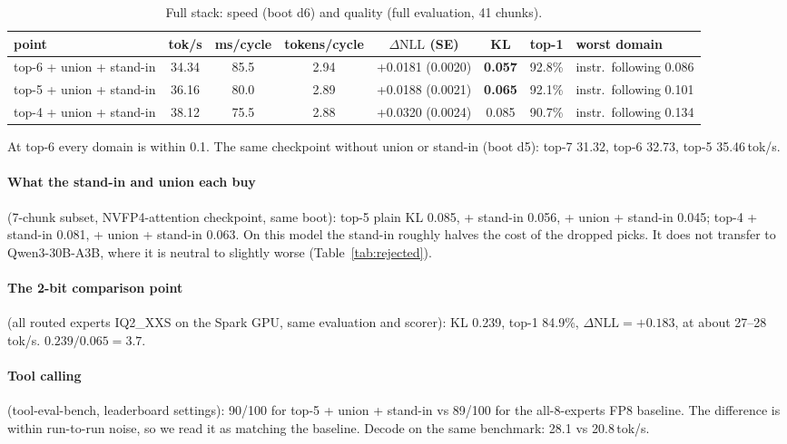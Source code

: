 \documentclass[11pt]{article}
\newcommand{\tps}{\,tok/s}
\newcommand{\dNLL}{\Delta\mathrm{NLL}}
\begin{document}
\begin{table}[h]
\centering\small
\caption{Full stack: speed (boot d6) and quality (full evaluation, 41 chunks).}
\label{tab:stack}
\setlength{\tabcolsep}{4pt}
\begin{adjustbox}{max width=\linewidth}
\begin{tabular}{lccc|cccl}
\toprule
point & tok/s & ms/cycle & tokens/cycle & $\dNLL$ (SE) & KL & top-1 & worst domain \\
\midrule
top-6 + union + stand-in & 34.34 & 85.5 & 2.94 & +0.0181 (0.0020) & \textbf{0.057} & 92.8\% & instr.\ following 0.086 \\
top-5 + union + stand-in & 36.16 & 80.0 & 2.89 & +0.0188 (0.0021) & \textbf{0.065} & 92.1\% & instr.\ following 0.101 \\
top-4 + union + stand-in & 38.12 & 75.5 & 2.88 & +0.0320 (0.0024) & 0.085 & 90.7\% & instr.\ following 0.134 \\
\bottomrule
\end{tabular}
\end{adjustbox}
\end{table}

At top-6 every domain is within 0.1. The same checkpoint without union or stand-in (boot d5): top-7 31.32, top-6 32.73, top-5 35.46\tps.

\paragraph{What the stand-in and union each buy} (7-chunk subset, NVFP4-attention checkpoint, same boot): top-5 plain
KL 0.085, + stand-in 0.056, + union + stand-in 0.045; top-4 + stand-in 0.081, + union + stand-in 0.063. On this model
the stand-in roughly halves the cost of the dropped picks. It does not transfer to Qwen3-30B-A3B, where it is neutral to
slightly worse (Table~\ref{tab:rejected}).

\paragraph{The 2-bit comparison point} (all routed experts IQ2\_XXS on the Spark GPU, same evaluation and scorer): KL
0.239, top-1 84.9\%, $\dNLL = +0.183$, at about 27--28\tps. $0.239 / 0.065 = 3.7$.

\paragraph{Tool calling} (tool-eval-bench, leaderboard settings): 90/100 for top-5 + union + stand-in vs 89/100 for the
all-8-experts FP8 baseline. The difference is within run-to-run noise, so we read it as matching the baseline. Decode on
the same benchmark: 28.1 vs 20.8\tps.
\end{document}
